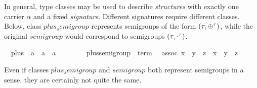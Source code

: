 \begin{isabelle}
\begin{isamarkuptext}
 \medskip In general, type classes may be used to describe
 \emph{structures} with exactly one carrier $\alpha$ and a fixed
 \emph{signature}.  Different signatures require different classes.
 Below, class $plus_semigroup$ represents semigroups of the form
 $(\tau, \oplus^\tau)$, while the original $semigroup$ would correspond
 to semigroups $(\tau, \cdot^\tau)$.%
\end{isamarkuptext}%
\isanewline
\ \ plus\ {\isacharcolon}{\isacharcolon}\ {\isachardoublequote}{\isacharprime}a\ {\isasymRightarrow}\ {\isacharprime}a\ {\isasymRightarrow}\ {\isacharprime}a{\isachardoublequote}\ \ \ \ {\isacharparenleft}\ {\isachardoublequote}{\isasymOplus}{\isachardoublequote}\ \isanewline
{}\isanewline
\ \ plus{\isacharunderscore}semigroup\ {\isacharless}\ {\isachardoublequote}term{\isachardoublequote}\isanewline
\ \ assoc{\isacharcolon}\ {\isachardoublequote}{\isacharparenleft}x\ {\isasymOplus}\ y{\isacharparenright}\ {\isasymOplus}\ z\ {\isacharequal}\ x\ {\isasymOplus}\ {\isacharparenleft}y\ {\isasymOplus}\ z{\isacharparenright}{\isachardoublequote}%
\begin{isamarkuptext}%
\noindent Even if classes $plus_semigroup$ and $semigroup$ both
 represent semigroups in a sense, they are certainly not quite the
 same.%
\end{isamarkuptext}%
\end{isabelle}%
